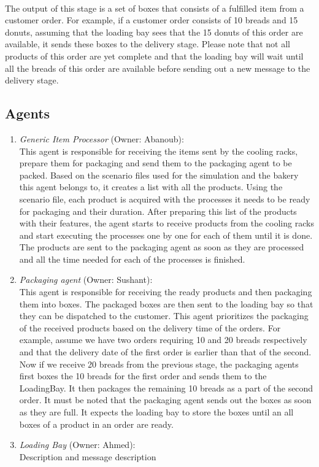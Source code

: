 \documentclass[11pt, a4paper]{article}
\begin{document}
\paragraph{}
The output of this stage is a set of boxes that consists of a fulfilled item from a customer order. For example, if a customer order consists of 10 breads and 15 donuts, assuming that the loading bay sees that the 15 donuts of this order are available, it sends these boxes to the delivery stage. Please note that not all products of this order are yet complete and that the loading bay will wait until all the breads of this order are available before sending out a new message to the delivery stage.

\subsection{Agents}\label{PackagingAgents}
\begin{enumerate}
	\item \textit{Generic Item Processor} (Owner: Abanoub):\\
	This agent is responsible for receiving the items sent by the cooling racks, prepare them for packaging and send them to the packaging agent to be packed. Based on the scenario files used for the simulation and the bakery this agent belongs to, it creates a list with all the products. Using the scenario file, each product is acquired with the processes it needs to be ready for packaging and their duration. After preparing this list of the products with their features, the agent starts to receive products from the cooling racks and start executing the processes one by one for each of them until it is done. The products are sent to the packaging agent as soon as they are processed and all the time needed for each of the processes is finished.
	\item \textit{Packaging agent} (Owner: Sushant):\\
	This agent is responsible for receiving the ready products and then packaging them into boxes. The packaged boxes are then sent to the loading bay so that they can be dispatched to the customer. This agent prioritizes the packaging of the received products based on the delivery time of the orders. For example, assume we have two orders requiring 10 and 20 breads respectively and that the delivery date of the first order is earlier than that of the second. Now if we receive 20 breads from the previous stage, the packaging agents first boxes the 10 breads for the first order and sends them to the LoadingBay. It then packages the remaining 10 breads as a part of the second order. It must be noted that the packaging agent sends out the boxes as soon as they are full. It expects the loading bay to store the boxes until an all boxes of a product in an order are ready.
	\item \textit{Loading Bay} (Owner: Ahmed):\\
	Description and message description
\end{enumerate}
\end{document}

